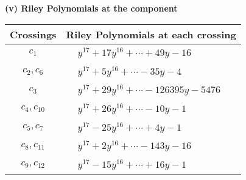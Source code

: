\documentclass[1p]{elsarticle_modified}
\theoremstyle{definition}
\begin{document}
\newpage\renewcommand{\arraystretch}{1}
\flushleft \textbf{(v) Riley Polynomials at the component}\newline \\
\begin{tabular}{m{50pt}|m{274pt}}
Crossings & \hspace{64pt}Riley Polynomials at each crossing \\
\hline $$\begin{aligned}c_{1}\end{aligned}$$&$\begin{aligned}
&y^{17}+17 y^{16}+\cdots+49 y-16
\end{aligned}$\\
\hline $$\begin{aligned}c_{2},c_{6}\end{aligned}$$&$\begin{aligned}
&y^{17}+5 y^{16}+\cdots-35 y-4
\end{aligned}$\\
\hline $$\begin{aligned}c_{3}\end{aligned}$$&$\begin{aligned}
&y^{17}+29 y^{16}+\cdots-126395 y-5476
\end{aligned}$\\
\hline $$\begin{aligned}c_{4},c_{10}\end{aligned}$$&$\begin{aligned}
&y^{17}+26 y^{16}+\cdots-10 y-1
\end{aligned}$\\
\hline $$\begin{aligned}c_{5},c_{7}\end{aligned}$$&$\begin{aligned}
&y^{17}-25 y^{16}+\cdots+4 y-1
\end{aligned}$\\
\hline $$\begin{aligned}c_{8},c_{11}\end{aligned}$$&$\begin{aligned}
&y^{17}+2 y^{16}+\cdots-143 y-16
\end{aligned}$\\
\hline $$\begin{aligned}c_{9},c_{12}\end{aligned}$$&$\begin{aligned}
&y^{17}-15 y^{16}+\cdots+16 y-1
\end{aligned}$\\
\hline
\end{tabular}\\~\\
\end{document}
